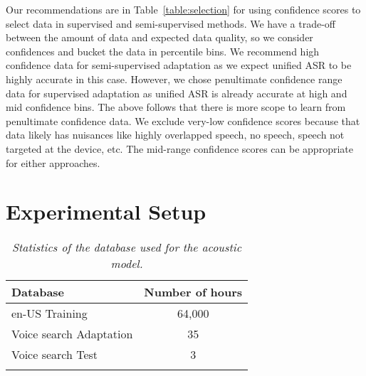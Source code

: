 \documentclass[a4paper]{article}
\begin{document}
Our recommendations are in Table~\ref{table:selection} for using confidence scores to select data in supervised and semi-supervised methods. We have a trade-off between the amount of data and expected data quality, so we consider confidences and bucket the data in percentile bins. We recommend high confidence data for semi-supervised adaptation as we expect unified ASR to be highly accurate in this case. However, we chose penultimate confidence range data for supervised adaptation as unified ASR is already accurate at high and mid confidence bins. The above follows that there is more scope to learn from penultimate confidence data. We exclude very-low confidence scores because that data likely has nuisances like highly overlapped speech, no speech, speech not targeted at the device, etc. The mid-range confidence scores can be appropriate for either approaches.
\section{Experimental Setup}
\label{sec:exp}
\begin{table}[t]
\begin{scriptsize}
\begin{center}
\caption{{\it Statistics of the database used for the acoustic model.}}
\label{table:Data}
\begin{tabular}{lc}
\toprule
Database & Number of hours\\
\midrule
\midrule
en-US Training & 64,000 \\
Voice search Adaptation  & 35 \\ %
Voice search Test & 3\\ %
\bottomrule
\vspace{-2em}
\end{tabular}
\end{center}
\end{scriptsize}
\end{table}
\end{document}
